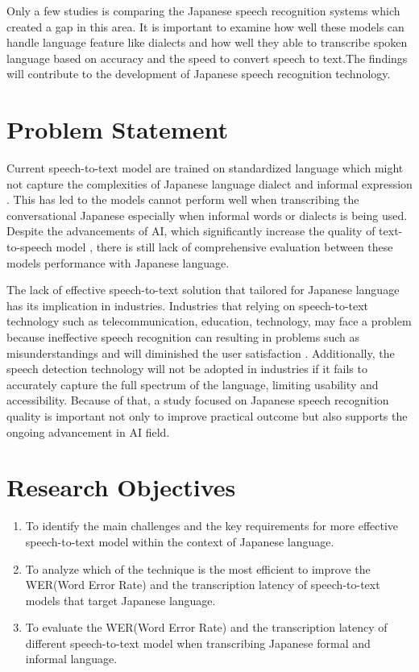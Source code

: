 Only a few studies is comparing the Japanese speech recognition systems which created a gap in this area. It is important to examine how well these models can handle language feature like dialects and how well they able to transcribe spoken language based on accuracy and the speed to convert speech to text.The findings will contribute to the development of Japanese speech recognition technology.



\section{Problem Statement}

Current speech-to-text model are trained on standardized language which might not capture the complexities of Japanese language dialect and informal expression \parencite{imaizumi2022}. This has led to the models cannot perform well when transcribing the conversational Japanese especially when informal words or dialects is being used. Despite the advancements of AI, which significantly increase the quality of text-to-speech model \parencite{Karita2021}, there is still lack of comprehensive evaluation between these models performance with Japanese language. 


The lack of effective speech-to-text solution that tailored for Japanese language has its implication in industries. Industries that relying on speech-to-text technology such as telecommunication, education, technology, may face a problem because ineffective speech recognition can resulting in problems such as misunderstandings and will diminished the user satisfaction \parencite{Sztahó2023}. Additionally, the speech detection technology will not be adopted in industries if it fails to accurately capture the full spectrum of the language, limiting usability and accessibility. Because of that, a study focused on Japanese speech recognition quality is important not only to improve practical outcome but also supports the ongoing advancement in AI field. 


\section{Research Objectives}
\begin{enumerate}
    \item To identify the main challenges and the key requirements for more effective speech-to-text model within the context of Japanese language.
    
    \item To analyze which of the technique is the most efficient to improve the WER(Word Error Rate) and the transcription latency of speech-to-text models that target Japanese language.

    \item To evaluate the WER(Word Error Rate) and the transcription latency of different speech-to-text model when transcribing Japanese formal and informal language.
\end{enumerate}

